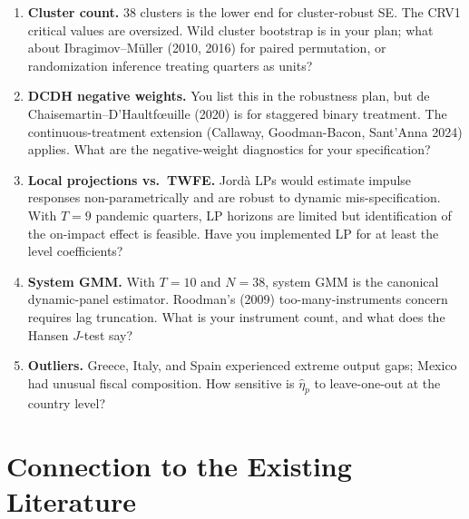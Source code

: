 \documentclass[11pt,a4paper]{article}
\begin{document}
\begin{enumerate}
\item \textbf{Cluster count.} 38 clusters is the lower end for cluster-robust SE. The CRV1 critical values are oversized. Wild cluster bootstrap is in your plan; what about Ibragimov--M\"uller (2010, 2016) for paired permutation, or randomization inference treating quarters as units?

\item \textbf{DCDH negative weights.} You list this in the robustness plan, but de Chaisemartin--D'Haultfœuille (2020) is for staggered binary treatment. The continuous-treatment extension (Callaway, Goodman-Bacon, Sant'Anna 2024) applies. What are the negative-weight diagnostics for your specification?

\item \textbf{Local projections vs.\ TWFE.} Jordà LPs would estimate impulse responses non-parametrically and are robust to dynamic mis-specification. With $T=9$ pandemic quarters, LP horizons are limited but identification of the on-impact effect is feasible. Have you implemented LP for at least the level coefficients?

\item \textbf{System GMM.} With $T=10$ and $N=38$, system GMM is the canonical dynamic-panel estimator. Roodman's (2009) too-many-instruments concern requires lag truncation. What is your instrument count, and what does the Hansen $J$-test say?

\item \textbf{Outliers.} Greece, Italy, and Spain experienced extreme output gaps; Mexico had unusual fiscal composition. How sensitive is $\hat\eta_p$ to leave-one-out at the country level?
\end{enumerate}

\section{Connection to the Existing Literature}
\end{document}

